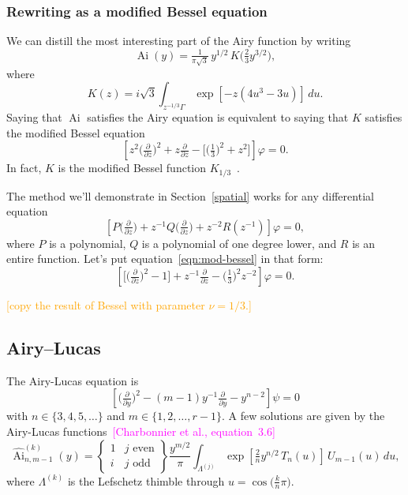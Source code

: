 \documentclass{article}
\DeclareMathOperator{\Ai}{Ai}
\begin{document}
\subsubsection{Rewriting as a modified Bessel equation}
We can distill the most interesting part of the Airy function by writing
\[ \Ai(y) = \tfrac{1}{\pi\sqrt{3}}\,y^{1/2}\,K\big(\tfrac{2}{3} y^{3/2}\big), \]
where
\begin{equation}\label{integral:mod-bessel}
K(z) = i\sqrt{3} \int_{z^{-1/3}\Gamma} \exp\left[-z \left(4u^3 - 3u\right)\right]\,du.
\end{equation}
Saying that $\Ai$ satisfies the Airy equation is equivalent to saying that $K$ satisfies the modified Bessel equation
\begin{equation}\label{eqn:mod-bessel}
\left[z^2 \big(\tfrac{\partial}{\partial z}\big)^2 + z \tfrac{\partial}{\partial z} - \big[\big(\tfrac{1}{3}\big)^2 + z^2\big]\right] \varphi = 0.
\end{equation}
In fact, $K$ is the modified Bessel function $K_{1/3}$~\cite[equation~9.6.1]{dlmf}.

The method we'll demonstrate in Section~\ref{spatial} works for any differential equation
\[ \left[ P\big(\tfrac{\partial}{\partial z}\big) + z^{-1} Q\big(\tfrac{\partial}{\partial z}\big) + z^{-2} R(z^{-1}) \right] \varphi = 0, \]
where $P$ is a polynomial, $Q$ is a polynomial of one degree lower, and $R$ is an entire function. Let's put equation~\ref{eqn:mod-bessel} in that form:
\begin{equation}\label{eqn:reg-mod-bessel}
\left[ \big[ \big(\tfrac{\partial}{\partial z}\big)^2 - 1 \big] + z^{-1} \tfrac{\partial}{\partial z} - \big(\tfrac{1}{3}\big)^2 z^{-2} \right] \varphi = 0.
\end{equation}

\textcolor{orange}{[copy the result of Bessel with parameter $\nu=1/3$.]}


\subsection{Airy--Lucas}
The Airy-Lucas equation is
\begin{equation}\label{eqn:airy-lucas}
\left[\big(\tfrac{\partial}{\partial y}\big)^2 - (m-1) y^{-1} \tfrac{\partial}{\partial y} - y^{n-2}\right] \psi = 0
\end{equation}
with $n \in \{3, 4, 5, \ldots\}$ and $m \in \{1, 2, \ldots, r-1\}$. A few solutions are given by the Airy-Lucas functions~\textcolor{magenta}{[Charbonnier et al., equation~3.6]}
\[ \widehat{\Ai}^{(k)}_{n, m-1}(y) = \left\{\begin{array}{ll}1 & j \text{ even} \\ i & j \text{ odd}\end{array}\right\} \frac{y^{m/2}}{\pi} \int_{\Lambda^{(j)}} \exp\left[\tfrac{2}{n} y^{n/2}\,T_n(u)\right]\,U_{m-1}(u)\,du, \]
where $\Lambda^{(k)}$ is the Lefschetz thimble through $u = \cos\big(\tfrac{k}{n}\pi\big)$.
\end{document}
